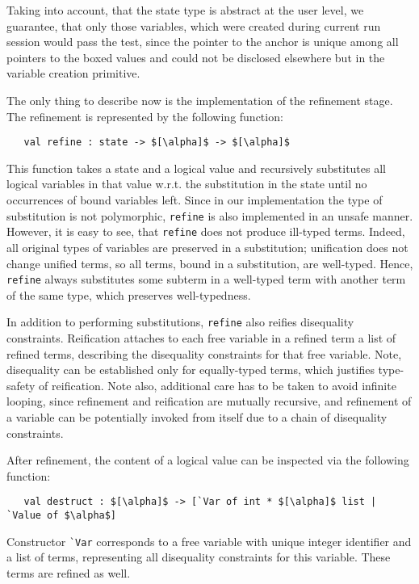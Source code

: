 Taking into account, that the state type is abstract at the user level, we guarantee, that only those variables, which were
created during current run session would pass the test, since the pointer to the anchor is unique among all pointers to the boxed values 
and could not be disclosed elsewhere but in the variable creation primitive.

The only thing to describe now is the implementation of the refinement stage. The refinement is represented by the following 
function:

\begin{lstlisting}
   val refine : state -> $[\alpha]$ -> $[\alpha]$ 
\end{lstlisting}

This function takes a state and a logical value and recursively substitutes all logical variables in that value w.r.t. 
the substitution in the state until no occurrences of bound variables left. Since in our implementation the type of substitution is
not polymorphic, \lstinline{refine} is also implemented in an unsafe manner. However, it is easy to see, that \lstinline{refine} 
does not produce ill-typed terms. Indeed, all original types of variables are preserved in a substitution; unification does not 
change unified terms, so all terms, bound in a substitution, are well-typed. Hence, \lstinline{refine} always substitutes
some subterm in a well-typed term with another term of the same type, which preserves well-typedness.

In addition to performing substitutions, \lstinline{refine} also reifies disequality constraints. Reification 
attaches to each free variable in a refined term a list of refined terms, describing the disequality constraints for that
free variable. Note, disequality can be established only for equally-typed terms, which justifies type-safety of reification. 
Note also, additional care has to be taken to avoid infinite looping, since refinement and reification are
mutually recursive, and refinement of a variable can be potentially invoked from itself due to a chain of disequality 
constraints.

After refinement, the content of a logical value can be inspected via the following function:

\begin{lstlisting}
   val destruct : $[\alpha]$ -> [`Var of int * $[\alpha]$ list | `Value of $\alpha$]
\end{lstlisting}

Constructor \lstinline{`Var} corresponds to a free variable with unique integer identifier and a list of terms, 
representing all disequality constraints for this variable. These terms are refined as well.

